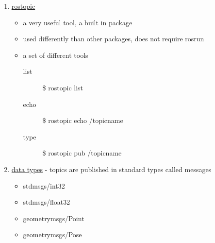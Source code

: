 \documentclass[12pt]{article}
\begin{document}
\begin{description}
\begin{enumerate}
            \item \href{http://wiki.ros.org/rostopic}{rostopic}                    
                \begin{itemize}   
                    \item a very useful tool, a built in package 
                    \item used differently than other packages, does not require rosrun
                    \item a set of different tools
                    \begin{description}   
                        \item [list] {\selectfont  \hspace{5mm} \$ rostopic list}\\
                        \item [echo] {\selectfont  \hspace{5mm} \$ rostopic echo /topicname}\\
                        \item [type] {\selectfont  \hspace{5mm} \$ rostopic pub /topicname}\\
                    \end{description}  
                \end{itemize}    
                    \item  \href{http://wiki.ros.org/msg}{data types} - topics are published in standard types called messages
                    \begin{itemize}
                        \item {\selectfont  \hspace{5mm} std\textunderscore msgs/int32 }
                        \item {\selectfont  \hspace{5mm} std\textunderscore msgs/float32 }\\
                        
                        \item {\selectfont  \hspace{5mm} geometry\textunderscore msgs/Point }
                        \item {\selectfont  \hspace{5mm} geometry\textunderscore msgs/Pose }\\
                        

\end{itemize}
\end{enumerate}
\end{description}
\end{document}
